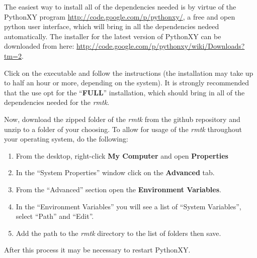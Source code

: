 The easiest way to install all of the dependencies needed is by virtue of the PythonXY program \href{http://code.google.com/p/pythonxy/}{http://code.google.com/p/pythonxy/}, a free and open python user interface, which will bring in all the dependencies nedeed automatically. The installer for the latest version of PythonXY can be downloaded from here: \href{http://code.google.com/p/pythonxy/wiki/Downloads?tm=2}{http://code.google.com/p/pythonxy/wiki/Downloads?tm=2}.

Click on the executable and follow the instructions (the installation may take up to half an hour or more, depending on the system). It is strongly recommended that the use opt for the ``\textbf{FULL}'' installation, which should bring in all of the dependencies needed for the \textit{rmtk}. 

Now, download the zipped folder of the \textit{rmtk} from the github repository and unzip to a folder of your choosing. To allow for usage of the \textit{rmtk} throughout your operating system, do the following: 

\begin{enumerate}
\item From the desktop, right-click \textbf{My Computer} and open \textbf{Properties}
\item In the ``System Properties'' window click on the \textbf{Advanced} tab.
\item From the ``Advanced'' section open the \textbf{Environment Variables}.
\item In the ``Environment Variables'' you will see a list of ``System Variables'', select ``Path'' and ``Edit''.
\item Add the path to the \textit{rmtk} directory to the list of folders then save.
\end{enumerate}

After this process it may be necessary to restart PythonXY.

